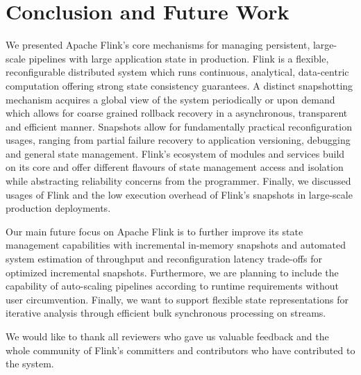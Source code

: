
\section{Conclusion and Future Work}
\label{sec:conclusion}

We presented Apache Flink's core mechanisms for managing persistent, large-scale pipelines with large application state in production. Flink is a flexible, reconfigurable distributed system which runs continuous, analytical, data-centric computation offering strong state consistency guarantees. A distinct snapshotting mechanism acquires a global view of the system periodically or upon demand which allows for coarse grained rollback recovery in a asynchronous, transparent and efficient manner. Snapshots allow for fundamentally practical reconfiguration usages, ranging from partial failure recovery to application versioning, debugging and general state management. Flink's ecosystem of modules and services build on its core and offer different flavours of state management access and isolation while abstracting reliability concerns from the programmer. Finally, we discussed usages of Flink and the low execution overhead of Flink's snapshots in large-scale production deployments.

\vspace{-1mm}
 Our main future focus on Apache Flink is to further improve its state management capabilities with incremental in-memory snapshots and automated system estimation of throughput and reconfiguration latency trade-offs for optimized incremental snapshots. Furthermore, we are planning to include the capability of auto-scaling pipelines according to runtime requirements without user circumvention. Finally, we want to support flexible state representations for iterative analysis through efficient bulk synchronous processing on streams.

\vspace{-1mm}
 We would like to thank all reviewers who gave us valuable feedback and the whole community of Flink's committers and contributors who have contributed to the system. 